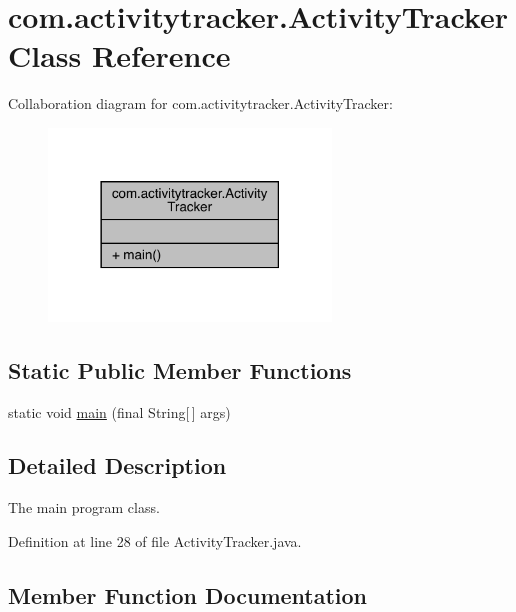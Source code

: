 \hypertarget{classcom_1_1activitytracker_1_1_activity_tracker}{}\section{com.\+activitytracker.\+Activity\+Tracker Class Reference}
\label{classcom_1_1activitytracker_1_1_activity_tracker}


Collaboration diagram for com.\+activitytracker.\+Activity\+Tracker\+:
\nopagebreak
\begin{figure}[H]
\begin{center}
\leavevmode
\includegraphics[width=213pt]{classcom_1_1activitytracker_1_1_activity_tracker__coll__graph}
\end{center}
\end{figure}
\subsection*{Static Public Member Functions}
\begin{DoxyCompactItemize}
\item 
static void \mbox{\hyperlink{classcom_1_1activitytracker_1_1_activity_tracker_a29cfd2975a07afe34e2a3112cbf32dc8}{main}} (final String\mbox{[}$\,$\mbox{]} args)
\end{DoxyCompactItemize}


\subsection{Detailed Description}
The main program class. 

Definition at line 28 of file Activity\+Tracker.\+java.



\subsection{Member Function Documentation}
\mbox{\label{classcom_1_1activitytracker_1_1_activity_tracker_a29cfd2975a07afe34e2a3112cbf32dc8}} 
